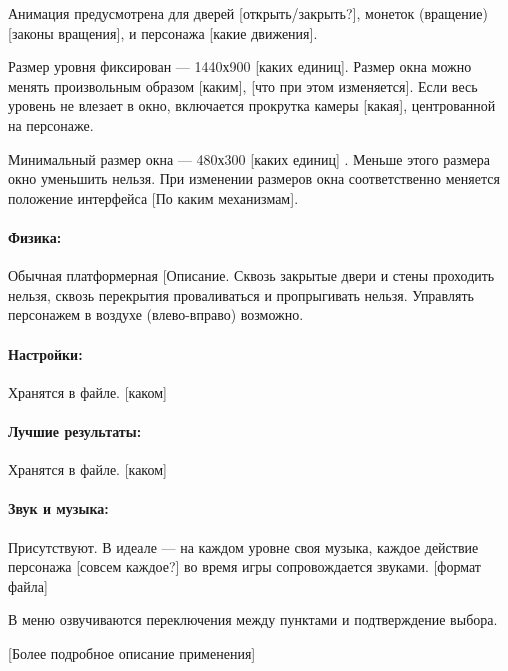 \documentclass[12pt,a4paper]{article}
\begin{document}
Анимация предусмотрена для дверей {\color{red} [открыть/закрыть?]}\ans{[Да]}, монеток (вращение) {\color{red} [законы вращения]}, и персонажа {\color{red} [какие движения]}.

Размер уровня фиксирован --- 1440х900 {\color{red} [каких единиц]}.\ans{[Пикселей]} Размер окна можно менять произвольным образом {\color{red} [каким], [что при этом изменяется]}. Если весь уровень не влезает в окно, включается прокрутка камеры {\color{red} [какая]}, центрованной на персонаже.

Минимальный размер окна --- 480х300 {\color{red} [каких единиц]} \ans{[Пикселей]}. Меньше этого размера окно уменьшить нельзя. При изменении размеров окна соответственно меняется положение интерфейса{\color{red} [По каким механизмам]}.

\paragraph{Физика:}
Обычная платформерная {\color{red} [Описание}\ans{:]}. Сквозь закрытые двери и стены {\color{red} про}ходить нельзя, сквозь перекрытия проваливаться и пропрыгивать нельзя. Управлять персонажем в воздухе (влево-вправо) возможно.

\paragraph{Настройки:}
Хранятся в файле. {\color{red} [каком]}

\paragraph{Лучшие результаты:}
Хранятся в файле. {\color{red} [каком]}

\paragraph{Звук и музыка:}
Присутствуют. В идеале --- на каждом уровне своя музыка, каждое действие персонажа {\color{red} [совсем каждое?]}\ans{[Да]} во время игры сопровождается звуками.{\color{red} [формат файла]}

В меню озвучиваются переключения между пунктами и подтверждение выбора.

{\color{red} [Более подробное описание применения]}
\end{document}
